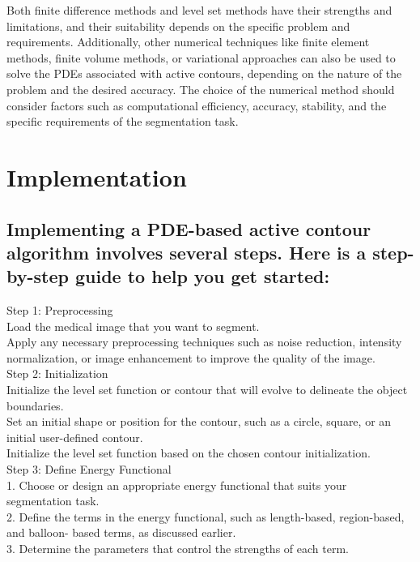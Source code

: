 \documentclass[]{report}
\begin{document}
Both finite difference methods and level set methods have their strengths and limitations, and their suitability depends on the specific problem and requirements. Additionally, other numerical techniques like finite element methods, finite volume methods, or variational approaches can also be used to solve the PDEs associated with active contours, depending on the nature of the problem and the desired accuracy. The choice of the numerical method should consider factors such as computational efficiency, accuracy, stability, and the specific requirements of the segmentation task.

\chapter*{Implementation}
\section*{Implementing a PDE-based active contour algorithm involves several steps. Here is a step-by-step guide to help you get started:}
Step 1: Preprocessing\\

Load the medical image that you want to segment.\\
Apply any necessary preprocessing techniques such as noise reduction, intensity normalization, or image enhancement to improve the quality of the image.\\

Step 2: Initialization\\

Initialize the level set function or contour that will evolve to delineate the object boundaries.\\
Set an initial shape or position for the contour, such as a circle, square, or an initial user-defined contour.\\
Initialize the level set function based on the chosen contour initialization.\\

Step 3: Define Energy Functional\\

1. Choose or design an appropriate energy functional that suits your segmentation task.\\
2. Define the terms in the energy functional, such as length-based, region-based, and balloon- 
   based terms, as discussed earlier.\\
3. Determine the parameters that control the strengths of each term.\\
\end{document}
